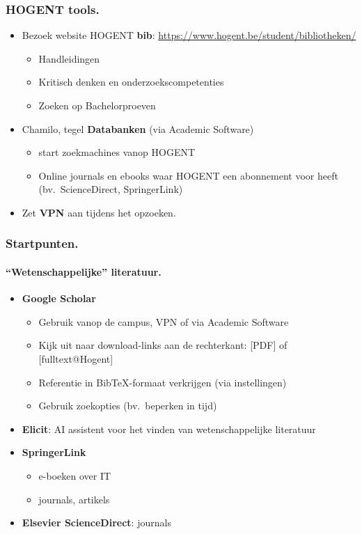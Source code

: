 \documentclass[aspectratio=169]{beamer}
\begin{document}
\begin{frame}
  \frametitle{HOGENT tools.}

  \begin{itemize}
    \item<+-> Bezoek website HOGENT \textbf{bib}: \url{https://www.hogent.be/student/bibliotheken/}
      \begin{itemize}
        \item Handleidingen
        \item Kritisch denken en onderzoekscompetenties
        \item Zoeken op Bachelorproeven
      \end{itemize}
    \item<+-> Chamilo, tegel \textbf{Databanken} (via Academic Software)
      \begin{itemize}
        \item start zoekmachines vanop HOGENT
        \item Online journals en ebooks waar HOGENT een abonnement voor heeft (bv.~ScienceDirect, SpringerLink)
      \end{itemize}
    \item<+-> Zet \textbf{VPN} aan tijdens het opzoeken.
  \end{itemize}
\end{frame}

\begin{frame}
  \frametitle{Startpunten.}
  \framesubtitle{``Wetenschappelijke'' literatuur.}

  \begin{itemize}
    \item<+-> \textbf{Google Scholar}
      \begin{itemize}
        \item Gebruik vanop de campus, VPN of via Academic Software
        \item Kijk uit naar download-links aan de rechterkant: [PDF] of [fulltext@Hogent]
        \item Referentie in Bib{\TeX}-formaat verkrijgen (via instellingen)
        \item Gebruik zoekopties (bv.~beperken in tijd)
      \end{itemize}
    \item<+-> \textbf{Elicit}: AI assistent voor het vinden van wetenschappelijke literatuur
    \item<+-> \textbf{SpringerLink}
      \begin{itemize}
        \item e-boeken over IT
        \item journals, artikels
      \end{itemize}
    \item<+-> \textbf{Elsevier ScienceDirect}: journals
  \end{itemize}
\end{frame}
\end{document}
